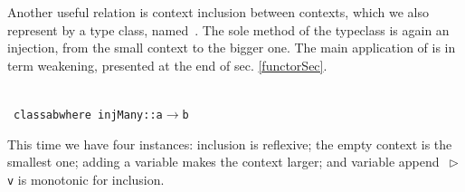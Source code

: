 \documentclass[9pt,authoryear]{sigplanconf}
\begin{document}
%
Another useful relation is context inclusion between contexts, which we also
    represent by a type class, named{~}\texttt{\makebox[1.83ex][c]{$ \subseteq $}}. The sole method of the
    typeclass is again an injection, from the small context to the
    bigger one. The main application of \texttt{\makebox[1.83ex][c]{$ \subseteq $}} is in term weakening,
    presented at the end of sec. \ref{functorSec}.%


{\nopagebreak }

%
%
%
~\\~\vphantom{$\{$}\texttt{class}\texttt{\mbox{\hspace{0.50em}}}\texttt{a}\texttt{\mbox{\hspace{0.50em}}}\texttt{\makebox[1.83ex][c]{$ \subseteq $}}\texttt{\mbox{\hspace{0.50em}}}\texttt{b}\texttt{\mbox{\hspace{0.50em}}}\texttt{where}\texttt{{\nopagebreak \newline%
}\vphantom{$\{$}}\texttt{\mbox{\hspace{0.50em}}}\texttt{\mbox{\hspace{0.50em}}}\texttt{injMany}\texttt{\mbox{\hspace{0.50em}}}\texttt{{:}{:}}\texttt{\mbox{\hspace{0.50em}}}\texttt{a}\texttt{\mbox{\hspace{0.50em}}}\texttt{$ \rightarrow $}\texttt{\mbox{\hspace{0.50em}}}\texttt{b}\texttt{{\nopagebreak \newline%
}\vphantom{$\{$}}%


%
This time we have four instances{:} inclusion is reflexive; the empty
    context is the smallest one; adding a variable makes the context
    larger; and variable append{~}\texttt{\makebox[1.22ex][l]{$ {(} $}}\texttt{$ \vartriangleright $}\texttt{\mbox{\hspace{0.50em}}}\texttt{v}\texttt{\makebox[1.22ex][r]{$ {)} $}} is monotonic for inclusion.%


{\nopagebreak }
\end{document}

